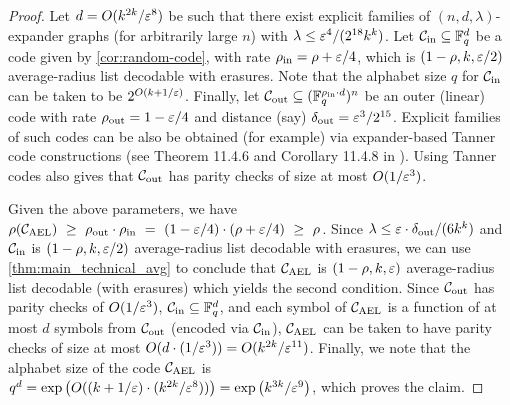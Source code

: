 \begin{proof}
Let $d = O(k^{2k}/\varepsilon^8)$ be such that there exist explicit families of $(n,d,\lambda)$-expander graphs (for arbitrarily large $n$) with $\lambda \leq \varepsilon^4/(2^{18} k^k)$. 
%
Let ${\mathcal C}_{\mathrm{in}} \subseteq {\mathbb F}_q^d$ be a code given by \cref{cor:random-code}, with rate $\rho_{\mathrm{in}} = \rho + \varepsilon/4$, which is $(1 - \rho, k, \varepsilon/2)$ average-radius list decodable with erasures. Note that the alphabet size $q$ for ${\mathcal C}_{\mathrm{in}}$ can be taken to be $2^{O(k + 1/\varepsilon)}$.
%
Finally, let ${\mathcal C}_{\mathrm{out}} \subseteq ({\mathbb F}_q^{\rho_{\mathrm{in}} \cdot d})^n$ be an outer (linear) code with rate $\rho_{\mathrm{out}} = 1 - \varepsilon/4$ and distance (say) $\delta_{\mathrm{out}} = \varepsilon^3/2^{15}$. Explicit families of such codes can be also be obtained (for example) via expander-based Tanner code constructions (see Theorem 11.4.6 and Corollary 11.4.8 in \cite{GRS23}). Using Tanner codes also gives that ${\mathcal C}_{\mathrm{out}}$ has parity checks of size at most $O(1/\varepsilon^3)$.
%

Given the above parameters, we have 
$\rho({ {\mathcal C}_{\mathrm{AEL}} }) ~\geq~ \rho_{\mathrm{out}} \cdot \rho_{\mathrm{in}} ~=~ (1-\varepsilon/4) \cdot (\rho + \varepsilon/4) ~\geq~ \rho$.
%
Since $\lambda \leq \varepsilon \cdot \delta_{\mathrm{out}}/(6k^k)$ and ${\mathcal C}_{\mathrm{in}}$ is $(1-\rho, k, \varepsilon/2)$ average-radius list decodable with erasures, we can use \cref{thm:main_technical_avg} to conclude that ${ {\mathcal C}_{\mathrm{AEL}} }$ is $(1-\rho, k, \varepsilon)$ average-radius list decodable (with erasures) which yields the second condition. 
%
Since ${\mathcal C}_{\mathrm{out}}$ has parity checks of $O(1/\varepsilon^3)$, ${\mathcal C}_{\mathrm{in}} \subseteq {\mathbb F}_q^d$, and each symbol of ${ {\mathcal C}_{\mathrm{AEL}} }$ is a function of at most $d$ symbols from ${\mathcal C}_{\mathrm{out}}$ (encoded via ${\mathcal C}_{\mathrm{in}}$), ${ {\mathcal C}_{\mathrm{AEL}} }$ can be taken to have parity checks of size at most $O(d \cdot (1/\varepsilon^3)) = O(k^{2k}/\varepsilon^{11})$.
%
Finally, we note that the alphabet size of the code ${ {\mathcal C}_{\mathrm{AEL}} }$ is $q^d = \exp\left(O((k + 1/\varepsilon) \cdot (k^{2k}/\varepsilon^8))\right) = \exp\left(k^{3k}/\varepsilon^9\right)$, which proves the claim. 
\end{proof}

\vspace{-5 pt}
